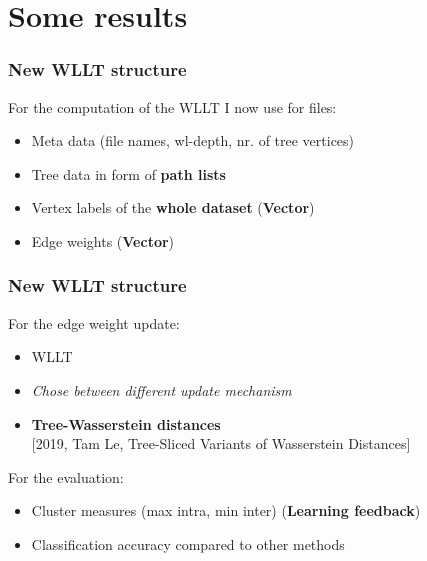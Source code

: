 \section{Some results}

\begin{frame}
\frametitle{New WLLT structure}
	For the computation of the WLLT I now use for files:
	\begin{itemize}
		\item Meta data (file names, wl-depth, nr. of tree vertices) \newline
		\item Tree data in form of \textbf{path lists} \newline
		\item Vertex labels of the \textbf{whole dataset} (\textbf{Vector}) \newline
		\item Edge weights (\textbf{Vector})
	\end{itemize}
\end{frame}

\begin{frame}
\frametitle{New WLLT structure}
	For the edge weight update:
	\begin{itemize}
		\item WLLT
		\item \textit{Chose between different update mechanism}
		\item \textbf{Tree-Wasserstein distances}\\
		\tiny{[2019, Tam Le, Tree-Sliced Variants of Wasserstein Distances]} \newline
	\end{itemize}

	For the evaluation:
	\begin{itemize}
		\item Cluster measures (max intra, min inter) (\textbf{Learning feedback})
		\item Classification accuracy compared to other methods
	\end{itemize}
\end{frame}

